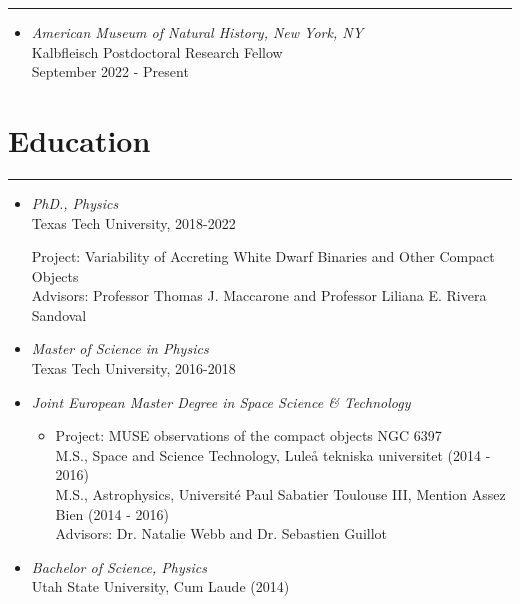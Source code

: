 \documentclass[letterpaper,10pt]{article}
\begin{document}
\hrule
\vspace{.3 cm}
\begin{itemize}[label=$\blacktriangleright$]


 \item \emph{American Museum of Natural History, New York, NY}\\
 Kalbfleisch Postdoctoral Research Fellow \\
 September 2022 - Present

\end{itemize}



\section*{Education}

\hrule
\vspace{.3 cm}


\begin{itemize}[label=$\blacktriangleright$]



  \item \emph{PhD., Physics}  \\
   Texas Tech University, 2018-2022
      \begin{itemize}[label=]
     Project: Variability of Accreting White Dwarf Binaries and Other Compact Objects  \\
     Advisors: Professor Thomas J. Maccarone and Professor Liliana E. Rivera Sandoval 
      \end{itemize}





  \item \emph{Master of Science in Physics}  \\
   Texas Tech University, 2016-2018



  \item \emph{Joint European Master Degree in Space Science \& Technology} 
  \begin{itemize}[label=]
      \vspace{-.05cm}
      \item Project: MUSE observations of the compact objects NGC 6397 \\
      M.S., Space and Science Technology, Lule\r a tekniska universitet  (2014 - 2016) \\
      M.S., Astrophysics, Universit\'e Paul Sabatier Toulouse III, Mention Assez Bien (2014 - 2016) \\
      Advisors: Dr. Natalie Webb and Dr. Sebastien Guillot
  \end{itemize}




  \item \emph{Bachelor of Science, Physics}  \\
   Utah State University, Cum Laude (2014)

\end{itemize}
\end{document}
